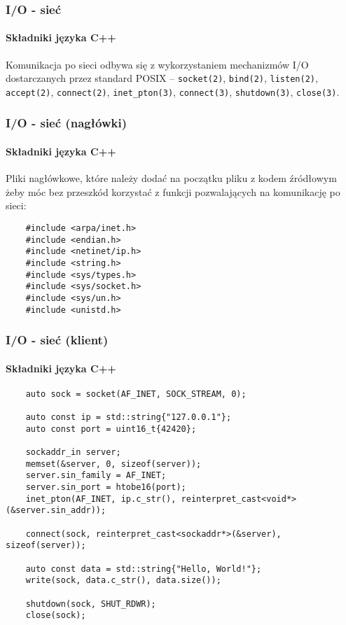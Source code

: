 \documentclass[aspectratio=169]{beamer}
\begin{document}
\begin{frame}
    \frametitle{I/O - sieć}
    \framesubtitle{Składniki języka C++}

    Komunikacja po sieci odbywa się z wykorzystaniem mechanizmów I/O
    dostarczanych przez standard POSIX --
    {\tt socket(2)},
    {\tt bind(2)},
    {\tt listen(2)},
    {\tt accept(2)},
    {\tt connect(2)},
    {\tt inet\_pton(3)},
    {\tt connect(3)},
    {\tt shutdown(3)},
    {\tt close(3)}.
\end{frame}

\begin{frame}[fragile]
    \frametitle{I/O - sieć (nagłówki)}
    \framesubtitle{Składniki języka C++}

    Pliki nagłówkowe, które należy dodać na początku pliku z kodem źródłowym
    żeby móc bez przeszkód korzystać z funkcji pozwalających na komunikację po
    sieci:

    {\small
    \begin{lstlisting}
    #include <arpa/inet.h>
    #include <endian.h>
    #include <netinet/ip.h>
    #include <string.h>
    #include <sys/types.h>
    #include <sys/socket.h>
    #include <sys/un.h>
    #include <unistd.h>
    \end{lstlisting}}
\end{frame}

\begin{frame}[fragile]
    \frametitle{I/O - sieć (klient)}
    \framesubtitle{Składniki języka C++}

    {\scriptsize
    \begin{lstlisting}
    auto sock = socket(AF_INET, SOCK_STREAM, 0);

    auto const ip = std::string{"127.0.0.1"};
    auto const port = uint16_t{42420};

    sockaddr_in server;
    memset(&server, 0, sizeof(server));
    server.sin_family = AF_INET;
    server.sin_port = htobe16(port);
    inet_pton(AF_INET, ip.c_str(), reinterpret_cast<void*>(&server.sin_addr));

    connect(sock, reinterpret_cast<sockaddr*>(&server), sizeof(server));

    auto const data = std::string{"Hello, World!"};
    write(sock, data.c_str(), data.size());

    shutdown(sock, SHUT_RDWR);
    close(sock);
    \end{lstlisting}}
\end{frame}
\end{document}
